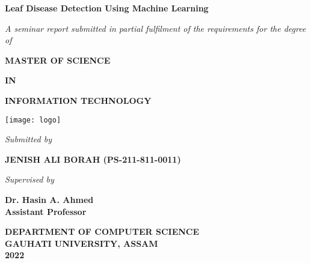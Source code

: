 \documentclass[12pt]{report}
\begin{document}
\begin{titlepage}
   \begin{center}
       \vspace*{0.5cm}

      { \LARGE \textbf{ Leaf Disease Detection Using Machine Learning}}
	\vspace{1.5cm}

       \textit{A seminar report submitted in partial fulfilment of the requirements for the degree of}
            
       \vspace{0.2cm}

        {\large \textbf{MASTER OF SCIENCE}}

       \vspace{0.2cm}

        {\large \textbf{IN}}

          \vspace{0.2cm}
         
        {\large \textbf{INFORMATION TECHNOLOGY}}

                
       \vspace{2cm}
     
      \texttt{[image: logo]}
       
       \vspace{2cm}

       \textit{Submitted by}

       \vspace{0.2cm}
       \textbf{JENISH ALI BORAH (PS-211-811-0011)}
            
     \vspace{2cm}

       \textit{Supervised by}

       \vspace{0.2cm}
       \textbf{Dr. Hasin A. Ahmed}\\
       \textbf{Assistant Professor}

      \vspace{4cm}
      \textbf{\large DEPARTMENT OF COMPUTER SCIENCE}\\
       \textbf{\large GAUHATI UNIVERSITY, ASSAM}\\
      \textbf{\large 2022}

   \end{center}
\end{titlepage}
\end{document}
